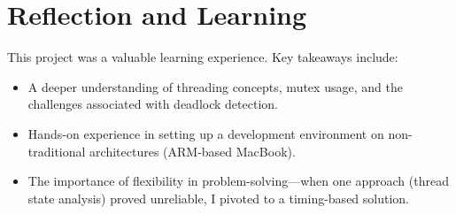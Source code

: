\documentclass[12pt]{article}
\begin{document}
\section{Reflection and Learning}
This project was a valuable learning experience. Key takeaways include:
\begin{itemize}
    \item A deeper understanding of threading concepts, mutex usage, and the challenges associated with deadlock detection.
    \item Hands-on experience in setting up a development environment on non-traditional architectures (ARM-based MacBook).
    \item The importance of flexibility in problem-solving—when one approach (thread state analysis) proved unreliable, I pivoted to a timing-based solution.
\end{itemize}

 

\end{document}
